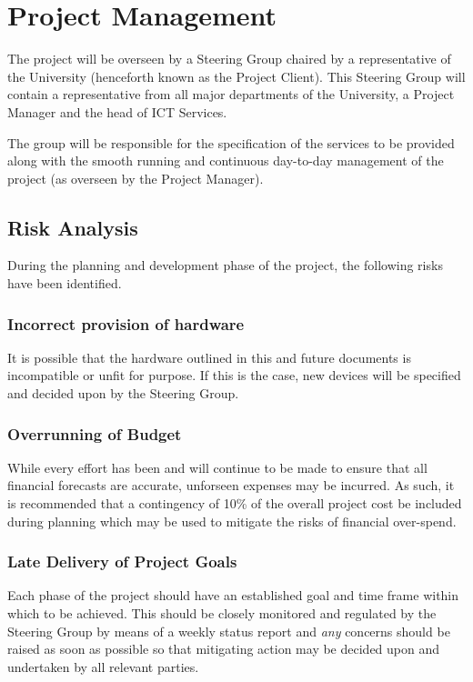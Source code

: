 \documentclass[a4paper, twoside]{article}
\begin{document}
\section{Project Management}
\label{sec:projman}
The project will be overseen by a Steering Group chaired by a representative of
the University (henceforth known as the Project Client). This Steering Group
will contain a representative from all major departments of the University, a
Project Manager and the head of ICT Services.

The group will be responsible for the specification of the services to be
provided along with the smooth running and continuous day-to-day management of the project
(as overseen by the Project Manager).

\subsection{Risk Analysis}
During the planning and development phase of the project, the following risks
have been identified.

\subsubsection{Incorrect provision of hardware}
It is possible that the hardware outlined in this and future documents is
incompatible or unfit for purpose. If this is the case, new devices will be
specified and decided upon by the Steering Group.

\subsubsection{Overrunning of Budget}
While every effort has been and will continue to be made to ensure that all
financial forecasts are accurate, unforseen expenses may be incurred. As such, it
is recommended that a contingency of 10\% of the overall project cost be
included during planning which may be used to mitigate the risks of financial
over-spend.

\subsubsection{Late Delivery of Project Goals}
Each phase of the project should have an established goal and time frame within
which to be achieved. This should be closely monitored and regulated by the
Steering Group by means of a weekly status report and \emph{any} concerns should be raised as soon as possible so
that mitigating action may be decided upon and undertaken by all relevant
parties.
\end{document}
